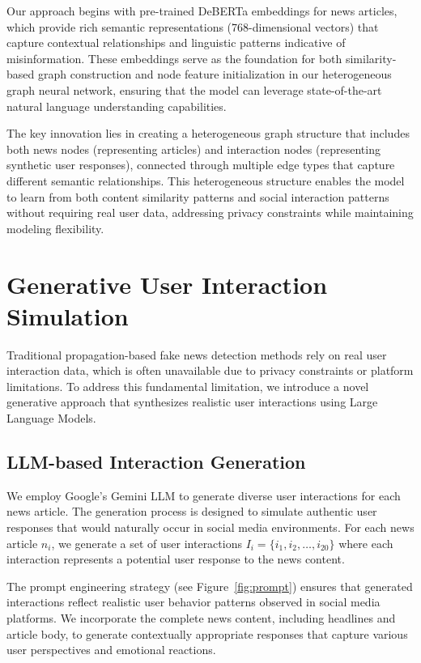 
Our approach begins with pre-trained DeBERTa embeddings for news articles, which provide rich semantic representations (768-dimensional vectors) that capture contextual relationships and linguistic patterns indicative of misinformation. These embeddings serve as the foundation for both similarity-based graph construction and node feature initialization in our heterogeneous graph neural network, ensuring that the model can leverage state-of-the-art natural language understanding capabilities.

The key innovation lies in creating a heterogeneous graph structure that includes both news nodes (representing articles) and interaction nodes (representing synthetic user responses), connected through multiple edge types that capture different semantic relationships. This heterogeneous structure enables the model to learn from both content similarity patterns and social interaction patterns without requiring real user data, addressing privacy constraints while maintaining modeling flexibility.

\section{Generative User Interaction Simulation}

Traditional propagation-based fake news detection methods rely on real user interaction data, which is often unavailable due to privacy constraints or platform limitations. To address this fundamental limitation, we introduce a novel generative approach that synthesizes realistic user interactions using Large Language Models.

\subsection{LLM-based Interaction Generation}

We employ Google's Gemini LLM to generate diverse user interactions for each news article. The generation process is designed to simulate authentic user responses that would naturally occur in social media environments. For each news article $n_i$, we generate a set of user interactions $I_i = \{i_1, i_2, \ldots, i_{20}\}$ where each interaction represents a potential user response to the news content.

The prompt engineering strategy (see Figure~\ref{fig:prompt}) ensures that generated interactions reflect realistic user behavior patterns observed in social media platforms. We incorporate the complete news content, including headlines and article body, to generate contextually appropriate responses that capture various user perspectives and emotional reactions.


